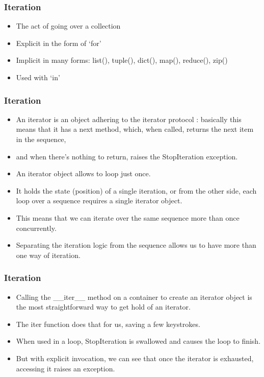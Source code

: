 \begin{frame}[fragile]\frametitle{Iteration}
    \begin{itemize}
    \item  The act of going over a collection
    \item  Explicit in the form of `for'
    \item  Implicit in many forms: list(), tuple(), dict(), map(), reduce(), zip()
    \item Used with `in'
    \end{itemize}
\end{frame}

\begin{frame}[fragile]\frametitle{Iteration}
    \begin{itemize}
    \item  An iterator is an object adhering to the iterator protocol : basically this means that it has a next method, which, when called, returns the next item in the sequence, 
    \item and when there's nothing to return, raises the StopIteration exception.
\item 
An iterator object allows to loop just once.
\item  It holds the state (position) of a single iteration, or from the other side, each loop over a sequence requires a single iterator object. 
\item This means that we can iterate over the same sequence more than once concurrently. 
\item Separating the iteration logic from the sequence allows us to have more than one way of iteration.
    \end{itemize}
\end{frame}

\begin{frame}[fragile]\frametitle{Iteration}
    \begin{itemize}
\item Calling the \_\_iter\_\_ method on a container to create an iterator object is the most straightforward way to get hold of an iterator. 
\item The iter function does that for us, saving a few keystrokes.
\item When used in a loop, StopIteration is swallowed and causes the loop to finish. 
\item But with explicit invocation, we can see that once the iterator is exhausted, accessing it raises an exception.
    \end{itemize}
\end{frame}

